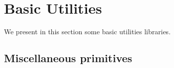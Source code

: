 \section{Basic Utilities} 

We present in this section some basic utilities libraries.

\subsection{Miscellaneous primitives} 


